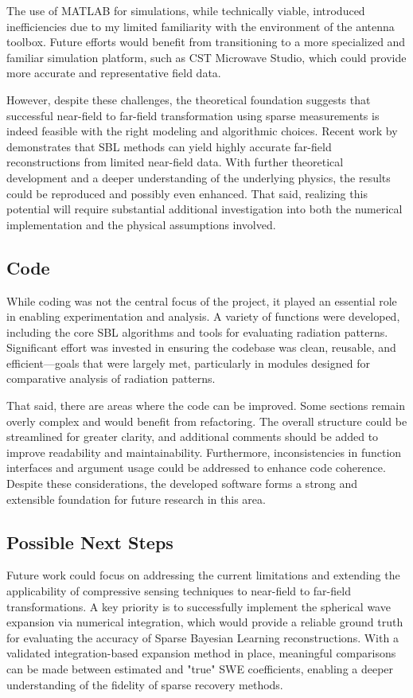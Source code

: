 \documentclass{article}
\begin{document}
The use of MATLAB for simulations, while technically viable, introduced inefficiencies due to my limited familiarity with the environment of the antenna toolbox. Future efforts would benefit from transitioning to a more specialized and familiar simulation platform, such as CST Microwave Studio, which could provide more accurate and representative field data.

However, despite these challenges, the theoretical foundation suggests that successful near-field to far-field transformation using sparse measurements is indeed feasible with the right modeling and algorithmic choices. Recent work by \citet{Hofmann2019minimum} demonstrates that SBL methods can yield highly accurate far-field reconstructions from limited near-field data. With further theoretical development and a deeper understanding of the underlying physics, the results could be reproduced and possibly even enhanced. That said, realizing this potential will require substantial additional investigation into both the numerical implementation and the physical assumptions involved.

\subsection{Code}
While coding was not the central focus of the project, it played an essential role in enabling experimentation and analysis. A variety of functions were developed, including the core SBL algorithms and tools for evaluating radiation patterns. Significant effort was invested in ensuring the codebase was clean, reusable, and efficient—goals that were largely met, particularly in modules designed for comparative analysis of radiation patterns.

That said, there are areas where the code can be improved. Some sections remain overly complex and would benefit from refactoring. The overall structure could be streamlined for greater clarity, and additional comments should be added to improve readability and maintainability. Furthermore, inconsistencies in function interfaces and argument usage could be addressed to enhance code coherence. Despite these considerations, the developed software forms a strong and extensible foundation for future research in this area.

\subsection{Possible Next Steps}
Future work could focus on addressing the current limitations and extending the applicability of compressive sensing techniques to near-field to far-field transformations. A key priority is to successfully implement the spherical wave expansion via numerical integration, which would provide a reliable ground truth for evaluating the accuracy of Sparse Bayesian Learning reconstructions. With a validated integration-based expansion method in place, meaningful comparisons can be made between estimated and "true" SWE coefficients, enabling a deeper understanding of the fidelity of sparse recovery methods.
\end{document}
